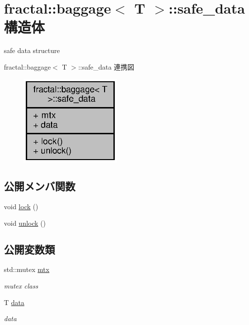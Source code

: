 \section{fractal\+:\+:baggage$<$ T $>$\+:\+:safe\+\_\+data 構造体}
\label{structfractal_1_1baggage_1_1safe__data}


safe data structure  




fractal\+:\+:baggage$<$ T $>$\+:\+:safe\+\_\+data 連携図
\nopagebreak
\begin{figure}[H]
\begin{center}
\leavevmode
\includegraphics[width=145pt]{structfractal_1_1baggage_1_1safe__data__coll__graph}
\end{center}
\end{figure}
\subsection*{公開メンバ関数}
\begin{DoxyCompactItemize}
\item 
void \hyperlink{structfractal_1_1baggage_1_1safe__data_aa441d027dbf60530c88a586a758e862e}{lock} ()
\item 
void \hyperlink{structfractal_1_1baggage_1_1safe__data_a7e1acde240d0f75ad744edfc114cdf55}{unlock} ()
\end{DoxyCompactItemize}
\subsection*{公開変数類}
\begin{DoxyCompactItemize}
\item 
std\+::mutex \hyperlink{structfractal_1_1baggage_1_1safe__data_a7a9929c47da7c72ea70f4f0b47609bc8}{mtx}
\begin{DoxyCompactList}\small\item\em mutex class \end{DoxyCompactList}\item 
T \hyperlink{structfractal_1_1baggage_1_1safe__data_afd9e1db72a670350da2a7fe2dbb17376}{data}
\begin{DoxyCompactList}\small\item\em data \end{DoxyCompactList}\end{DoxyCompactItemize}


